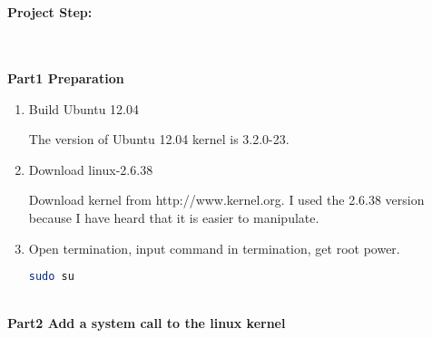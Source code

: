\documentclass[12pt,a4paper]{article}
\begin{document}
\noindent

\noindent{}

~\\
~\\
\begin{large}
\textbf{Project Step:}
\end{large}
~\\
~\\
\textbf{Part1 Preparation}
\begin{enumerate}

\item Build Ubuntu 12.04

\quad The version of Ubuntu 12.04 kernel is 3.2.0-23.

\item Download linux-2.6.38

\quad Download kernel from http://www.kernel.org. I used the 2.6.38 version because I have heard that it is easier to manipulate.

\item Open termination, input command in termination, get root power.
\begin{lstlisting}[language=bash]
sudo su
\end{lstlisting} 

\end{enumerate}
~\\
\textbf{Part2 Add a system call to the linux kernel}
\end{document}
